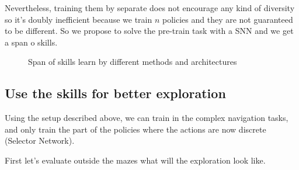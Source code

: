 \documentclass{article} %
\begin{document}
Nevertheless, training them by separate does not encourage any kind of diversity so it's doubly inefficient because we train $n$ policies and they are not guaranteed to be different. So we propose to solve the pre-train task with a SNN and we get a span o skills.

\begin{figure}[h]
	\centering
	\caption{Span of skills learn by different methods and architectures}
	\label{fig:visit_more}
\end{figure}

\subsection{Use the skills for better exploration}
Using the setup described above, we can train in the complex navigation tasks, and only train the part of the policies where the actions are now discrete (Selector Network).

First let's evaluate outside the mazes what will the exploration look like.
\end{document}
